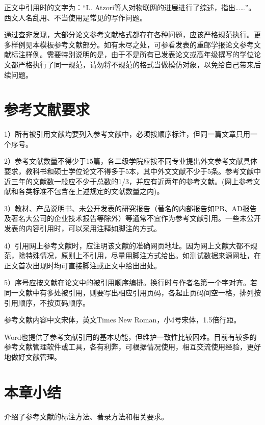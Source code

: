 正文中引用时的文字为：“L. Atzori等人对物联网的进展进行了综述，指出……”。西文人名乱用、不当使用是常见的写作问题。

通过查非发现，大部分论文参考文献格式都存在各种问题，应该严格规范执行。更多样例见本模板参考文献部分。如有未尽之处，可参看发表的重邮学报论文参考文献标注样例。需要特别说明的是，由于不是所有已发表论文或高年级撰写的学位论文都严格执行了同一规范，请勿将不规范的格式当做模仿对象，以免给自己带来后续问题。

\section{参考文献要求}

1）所有被引用文献均要列入参考文献中，必须按顺序标注，但同一篇文章只用一个序号。

2）参考文献数量不得少于15篇，各二级学院应按不同专业提出外文参考文献具体要求，教科书和硕士学位论文不得多于5本，其中外文文献不少于5条。参考文献中近三年的文献数一般应不少于总数的1/3，并应有近两年的参考文献。(网上参考文献和各类标准不包含在上述规定的文献数量之内)。

3）教材、产品说明书、未公开发表的研究报告（著名的内部报告如PB、AD报告及著名大公司的企业技术报告等除外）等通常不宜作为参考文献引用。一些未公开发表的内容引用时，可以采用注释如脚注的方式。

4）引用网上参考文献时，应注明该文献的准确网页地址。因为网上文献大都不规范，除特殊情况，原则上不引用，尽量用脚注方式给出。如测试数据来源网址，在正文首次出现时均可直接脚注或正文中给出出处。

5）序号应按文献在论文中的被引用顺序编排。换行时与作者名第一个字对齐。若同一文献中有多处被引用，则要写出相应引用页码，各起止页码间空一格，排列按引用顺序，不按页码顺序。

参考文献内容中文宋体，英文Times New Roman，小4号宋体，1.5倍行距。

Word也提供了参考文献引用的基本功能，但维护一致性比较困难。目前有较多的参考文献管理软件或工具，各有利弊，可根据情况使用，相互交流使用经验，更好地做好文献管理。

\section{本章小结}

介绍了参考文献的标注方法、著录方法和相关要求。










